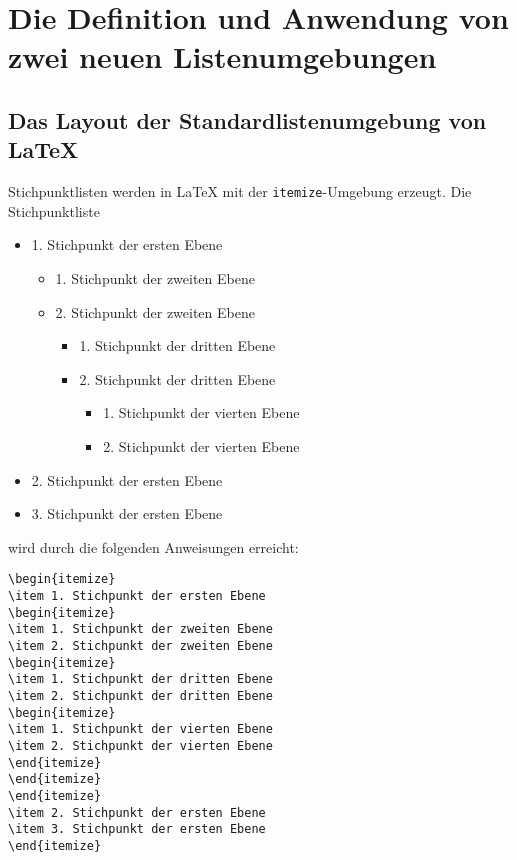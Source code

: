 \section{Die Definition und Anwendung von zwei neuen Listenumgebungen}

\subsection{Das Layout der Standardlistenumgebung von \LaTeX}

Stichpunktlisten werden in \LaTeX{} mit der \verb+itemize+-Umgebung erzeugt. 
Die Stichpunktliste 

\begin{itemize}
\item 1. Stichpunkt der ersten Ebene
\begin{itemize}
\item 1. Stichpunkt der zweiten Ebene
\item 2. Stichpunkt der zweiten Ebene
\begin{itemize}
\item 1. Stichpunkt der dritten Ebene
\item 2. Stichpunkt der dritten Ebene
\begin{itemize}
\item 1. Stichpunkt der vierten Ebene
\item 2. Stichpunkt der vierten Ebene
\end{itemize}
\end{itemize}
\end{itemize}
\item 2. Stichpunkt der ersten Ebene
\item 3. Stichpunkt der ersten Ebene
\end{itemize}

wird durch die folgenden Anweisungen erreicht:

\vspace*{-\baselineskip}

\begin{verbatim}
\begin{itemize}
\item 1. Stichpunkt der ersten Ebene
\begin{itemize}
\item 1. Stichpunkt der zweiten Ebene
\item 2. Stichpunkt der zweiten Ebene
\begin{itemize}
\item 1. Stichpunkt der dritten Ebene
\item 2. Stichpunkt der dritten Ebene
\begin{itemize}
\item 1. Stichpunkt der vierten Ebene
\item 2. Stichpunkt der vierten Ebene
\end{itemize}
\end{itemize}
\end{itemize}
\item 2. Stichpunkt der ersten Ebene
\item 3. Stichpunkt der ersten Ebene
\end{itemize}
\end{verbatim}

